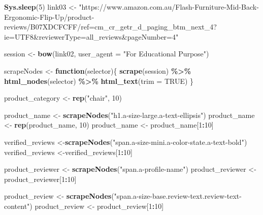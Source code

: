 \documentclass[
]{article}
\newenvironment{Shaded}{\begin{snugshade}}{\end{snugshade}}
\newcommand{\AttributeTok}[1]{\textcolor[rgb]{0.13,0.29,0.53}{#1}}
\newcommand{\ConstantTok}[1]{\textcolor[rgb]{0.56,0.35,0.01}{#1}}
\newcommand{\ControlFlowTok}[1]{\textcolor[rgb]{0.13,0.29,0.53}{\textbf{#1}}}
\newcommand{\DecValTok}[1]{\textcolor[rgb]{0.00,0.00,0.81}{#1}}
\newcommand{\FunctionTok}[1]{\textcolor[rgb]{0.13,0.29,0.53}{\textbf{#1}}}
\newcommand{\NormalTok}[1]{#1}
\newcommand{\OtherTok}[1]{\textcolor[rgb]{0.56,0.35,0.01}{#1}}
\newcommand{\SpecialCharTok}[1]{\textcolor[rgb]{0.81,0.36,0.00}{\textbf{#1}}}
\newcommand{\StringTok}[1]{\textcolor[rgb]{0.31,0.60,0.02}{#1}}
\begin{document}
\begin{Shaded}
\begin{Highlighting}[]
   \FunctionTok{Sys.sleep}\NormalTok{(}\DecValTok{5}\NormalTok{)}
\NormalTok{link03 }\OtherTok{\textless{}{-}} \StringTok{"https://www.amazon.com.au/Flash{-}Furniture{-}Mid{-}Back{-}Ergonomic{-}Flip{-}Up/product{-}reviews/B07XDCFCFF/ref=cm\_cr\_getr\_d\_paging\_btm\_next\_4?ie=UTF8\&reviewerType=all\_reviews\&pageNumber=4"}


\NormalTok{  session }\OtherTok{\textless{}{-}} \FunctionTok{bow}\NormalTok{(link02,}
               \AttributeTok{user\_agent =} \StringTok{"For Educational Purpose"}\NormalTok{)}

\NormalTok{  scrapeNodes }\OtherTok{\textless{}{-}} \ControlFlowTok{function}\NormalTok{(selector)\{}
    \FunctionTok{scrape}\NormalTok{(session) }\SpecialCharTok{\%\textgreater{}\%}
      \FunctionTok{html\_nodes}\NormalTok{(selector) }\SpecialCharTok{\%\textgreater{}\%}
      \FunctionTok{html\_text}\NormalTok{(}\AttributeTok{trim =} \ConstantTok{TRUE}\NormalTok{)}
\NormalTok{  \}}

\NormalTok{  product\_category }\OtherTok{\textless{}{-}} \FunctionTok{rep}\NormalTok{(}\StringTok{"chair"}\NormalTok{, }\DecValTok{10}\NormalTok{)}

\NormalTok{  product\_name }\OtherTok{\textless{}{-}} \FunctionTok{scrapeNodes}\NormalTok{(}\StringTok{"h1.a{-}size{-}large.a{-}text{-}ellipsis"}\NormalTok{)}
\NormalTok{  product\_name }\OtherTok{\textless{}{-}} \FunctionTok{rep}\NormalTok{(product\_name, }\DecValTok{10}\NormalTok{)}
\NormalTok{  product\_name }\OtherTok{\textless{}{-}}\NormalTok{ product\_name[}\DecValTok{1}\SpecialCharTok{:}\DecValTok{10}\NormalTok{]}
  
\NormalTok{  verified\_reviews }\OtherTok{\textless{}{-}}\FunctionTok{scrapeNodes}\NormalTok{(}\StringTok{"span.a{-}size{-}mini.a{-}color{-}state.a{-}text{-}bold"}\NormalTok{)}
\NormalTok{  verified\_reviews }\OtherTok{\textless{}{-}}\NormalTok{verified\_reviews[}\DecValTok{1}\SpecialCharTok{:}\DecValTok{10}\NormalTok{]}
  
\NormalTok{  product\_reviewer }\OtherTok{\textless{}{-}} \FunctionTok{scrapeNodes}\NormalTok{(}\StringTok{"span.a{-}profile{-}name"}\NormalTok{)}
\NormalTok{  product\_reviewer }\OtherTok{\textless{}{-}}\NormalTok{ product\_reviewer[}\DecValTok{1}\SpecialCharTok{:}\DecValTok{10}\NormalTok{]}
  
\NormalTok{  product\_review }\OtherTok{\textless{}{-}} \FunctionTok{scrapeNodes}\NormalTok{(}\StringTok{"span.a{-}size{-}base.review{-}text.review{-}text{-}content"}\NormalTok{)}
\NormalTok{  product\_review }\OtherTok{\textless{}{-}}\NormalTok{ product\_review[}\DecValTok{1}\SpecialCharTok{:}\DecValTok{10}\NormalTok{]}
  

\end{Highlighting}
\end{Shaded}
\end{document}
